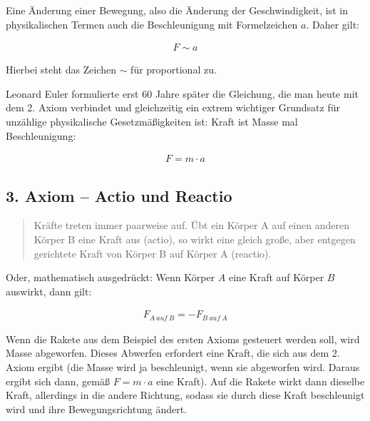 \noindent Eine Änderung einer Bewegung, also die Änderung der Geschwindigkeit, ist in physikalischen Termen auch die \glqq Beschleunigung\grqq{} mit Formelzeichen $a$. Daher gilt:

\begin{align}
	F \sim a
\end{align}

\noindent Hierbei steht das Zeichen $\sim$ für \glqq proportional zu\grqq . 

Leonard Euler formulierte erst 60 Jahre später die Gleichung, die man heute mit dem 2. Axiom verbindet und gleichzeitig ein extrem wichtiger Grundsatz für unzählige physikalische Gesetzmäßigkeiten ist: \glqq Kraft ist Masse mal Beschleunigung\grqq :

\begin{align}	\label{eq:2.axiom}
	F = m \cdot a
\end{align}


\subsection{3. Axiom -- Actio und Reactio}

\begin{quote}
\glqq Kräfte treten immer paarweise auf. Übt ein Körper A auf einen anderen Körper B eine Kraft aus (actio), so wirkt eine gleich große, aber entgegen gerichtete Kraft von Körper B auf Körper A (reactio).\grqq {}
\end{quote}

\noindent Oder, mathematisch ausgedrückt: Wenn Körper $A$ eine Kraft auf Körper $B$ auswirkt, dann gilt:

\begin{align}
	F_{A \ auf \ B} = -F_{B \ auf \ A}
\end{align}

\begin{Beispiel}
	Wenn die Rakete aus dem Beispiel des ersten Axioms gesteuert werden soll, wird Masse abgeworfen. Dieses Abwerfen erfordert eine Kraft, die sich aus dem 2. Axiom ergibt (die Masse wird ja beschleunigt, wenn sie abgeworfen wird. Daraus ergibt sich dann, gemäß $F=m \cdot a$ eine Kraft). Auf die Rakete wirkt dann dieselbe Kraft, allerdings in die andere Richtung, sodass sie durch diese Kraft beschleunigt wird und ihre Bewegungsrichtung ändert.
\end{Beispiel}





